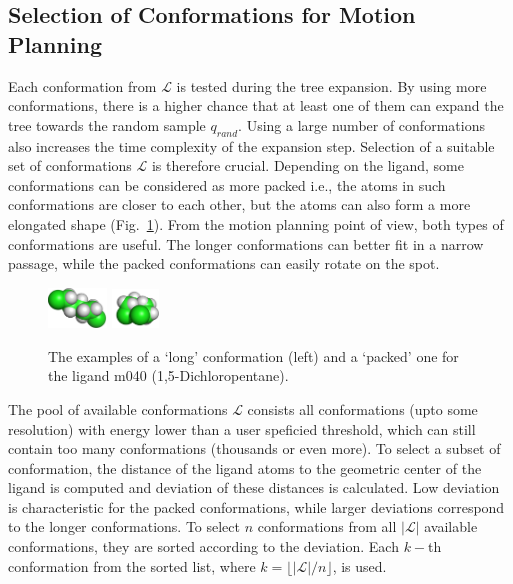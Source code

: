 \documentclass[usletter, 10pt, conference]{ieeeconf} %
\def\qrand{q_{rand}}
\def\L{\mathcal{L}}
\begin{document}
{\subsection{Selection of Conformations for Motion Planning}
\label{sec::strat}

Each conformation from $\L$ is tested during the tree expansion. %
By using more conformations, there is a higher chance that at least one of them can expand the tree towards the random sample $\qrand$.
Using a large number of conformations also increases the time complexity of the expansion step.
Selection of a suitable set of conformations $\L$ is therefore crucial.
Depending on the ligand, some conformations can be considered as more packed i.e., the atoms in such conformations are closer to each other, but 
the atoms can also form a more elongated shape (Fig.~\ref{fig::m040c}).
From the motion planning point of view, both types of conformations are useful.
The longer conformations can better fit in a narrow passage, while the packed conformations can easily rotate on the spot.
	
\begin{figure}[hb]
\centering
\includegraphics[width=0.14\textwidth]{fig/m040-conf1} \hskip 25pt
\includegraphics[width=0.11\textwidth]{fig/m040-conf2}
\caption{\label{fig::m040c}
    \small
 The examples of a `long' conformation (left) and a `packed' one for the ligand m040 (1,5-Dichloropentane).
}
\end{figure}

The pool of available conformations $\L$ consists all conformations (upto some resolution) with energy lower than a user speficied threshold, which can still contain too many conformations (thousands or even more).
To select a subset of conformation, the distance of the ligand atoms to the geometric center of the ligand is computed and 
deviation of these distances is calculated.
Low deviation is characteristic for the packed conformations, while larger deviations correspond to the longer conformations.
To select $n$ conformations from all $|\L|$ available conformations, they are sorted according to the deviation.
Each $k-$th conformation from the sorted list, where $k=\lfloor{|\L| / n}\rfloor$, is used.






}
\end{document}
